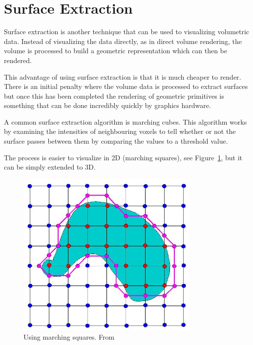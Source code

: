\section{Surface Extraction}\label{background:surfaceextraction}
Surface extraction is another technique that can be used to visualizing volumetric data. Instead of visualizing the data directly, as in direct volume rendering, the volume is processed to build a geometric representation which can then be rendered.

This advantage of using surface extraction is that it is much cheaper to render\cite{surfacevsvolumerendering}. There is an initial penalty where the volume data is processed to extract surfaces but once this has been completed the rendering of geometric primitives is something that can be done incredibly quickly by graphics hardware.

A common surface extraction algorithm is marching cubes. This algorithm works by examining the intensities of neighbouring voxels to tell whether or not the surface passes between them by comparing the values to a threshold value. 

The process is easier to visualize in 2D (marching squares), see Figure~\ref{fig:marching_squares}, but it can be simply extended to 3D.

\begin{figure}[H]
    \centering
	\includegraphics[width=0.8\textwidth]{images/background/marching_squares.jpg}
    \caption{Using marching squares. From \cite{marching_squares:image}}
    \label{fig:marching_squares}
\end{figure}

